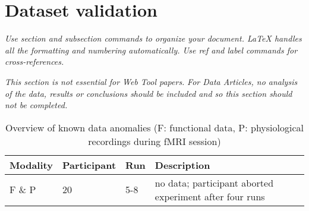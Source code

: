 \section*{Dataset validation}
\textit{Use section and subsection commands to organize your document. \LaTeX{} handles all the formatting and numbering automatically. Use ref and label commands for cross-references.}

\textit{This section is not essential for Web Tool papers. }
\textit{For Data Articles, no analysis of the data, results or conclusions should be included and so this section should not be completed. }

\begin{table}
  \centering
  \caption{Overview of known data anomalies (F: functional data,
    P: physiological recordings during fMRI session)}
  {\renewcommand{\arraystretch}{1.2}
  \begin{tabular}{lllp{9cm}}
    \toprule
    Modality & Participant & Run & Description \\
    \midrule
    F \& P & 20 & 5-8 & no data; participant aborted experiment after four runs \\
    \bottomrule
  \end{tabular}
}
  \label{tab:anomalies}
\end{table}



